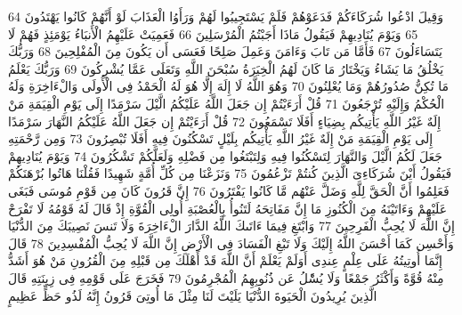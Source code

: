 \documentclass[20pt,a4paper]{article}
\begin{document}
{\tiny\colorbox{cl_aya}{64}} وَقِيلَ ادْعُوا شُرَكَاءَكُمْ فَدَعَوْهُمْ فَلَمْ يَسْتَجِيبُوا لَهُمْ وَرَأَوُا الْعَذَابَ لَوْ أَنَّهُمْ كَانُوا يَهْتَدُونَ
{\tiny\colorbox{cl_aya}{65}} وَيَوْمَ يُنَادِيهِمْ فَيَقُولُ مَاذَا أَجَبْتُمُ الْمُرْسَلِينَ
{\tiny\colorbox{cl_aya}{66}} فَعَمِيَتْ عَلَيْهِمُ الْأَنبَاءُ يَوْمَئِذٍ فَهُمْ لَا يَتَسَاءَلُونَ
{\tiny\colorbox{cl_aya}{67}} فَأَمَّا مَن تَابَ وَءَامَنَ وَعَمِلَ صَلِحًا فَعَسَى أَن يَكُونَ مِنَ الْمُفْلِحِينَ
{\tiny\colorbox{cl_aya}{68}} وَرَبُّكَ يَخْلُقُ مَا يَشَاءُ وَيَخْتَارُ مَا كَانَ لَهُمُ الْخِيَرَةُ سُبْحَنَ اللَّهِ وَتَعَلَى عَمَّا يُشْرِكُونَ
{\tiny\colorbox{cl_aya}{69}} وَرَبُّكَ يَعْلَمُ مَا تُكِنُّ صُدُورُهُمْ وَمَا يُعْلِنُونَ
{\tiny\colorbox{cl_aya}{70}} وَهُوَ اللَّهُ لَا إِلَهَ إِلَّا هُوَ لَهُ الْحَمْدُ فِى الْأُولَى وَالْءَاخِرَةِ وَلَهُ الْحُكْمُ وَإِلَيْهِ تُرْجَعُونَ
{\tiny\colorbox{cl_aya}{71}} قُلْ أَرَءَيْتُمْ إِن جَعَلَ اللَّهُ عَلَيْكُمُ الَّيْلَ سَرْمَدًا إِلَى يَوْمِ الْقِيَمَةِ مَنْ إِلَهٌ غَيْرُ اللَّهِ يَأْتِيكُم بِضِيَاءٍ أَفَلَا تَسْمَعُونَ
{\tiny\colorbox{cl_aya}{72}} قُلْ أَرَءَيْتُمْ إِن جَعَلَ اللَّهُ عَلَيْكُمُ النَّهَارَ سَرْمَدًا إِلَى يَوْمِ الْقِيَمَةِ مَنْ إِلَهٌ غَيْرُ اللَّهِ يَأْتِيكُم بِلَيْلٍ تَسْكُنُونَ فِيهِ أَفَلَا تُبْصِرُونَ
{\tiny\colorbox{cl_aya}{73}} وَمِن رَّحْمَتِهِ جَعَلَ لَكُمُ الَّيْلَ وَالنَّهَارَ لِتَسْكُنُوا فِيهِ وَلِتَبْتَغُوا مِن فَضْلِهِ وَلَعَلَّكُمْ تَشْكُرُونَ
{\tiny\colorbox{cl_aya}{74}} وَيَوْمَ يُنَادِيهِمْ فَيَقُولُ أَيْنَ شُرَكَاءِىَ الَّذِينَ كُنتُمْ تَزْعُمُونَ
{\tiny\colorbox{cl_aya}{75}} وَنَزَعْنَا مِن كُلِّ أُمَّةٍ شَهِيدًا فَقُلْنَا هَاتُوا بُرْهَنَكُمْ فَعَلِمُوا أَنَّ الْحَقَّ لِلَّهِ وَضَلَّ عَنْهُم مَّا كَانُوا يَفْتَرُونَ
{\tiny\colorbox{cl_aya}{76}} إِنَّ قَرُونَ كَانَ مِن قَوْمِ مُوسَى فَبَغَى عَلَيْهِمْ وَءَاتَيْنَهُ مِنَ الْكُنُوزِ مَا إِنَّ مَفَاتِحَهُ لَتَنُوأُ بِالْعُصْبَةِ أُولِى الْقُوَّةِ إِذْ قَالَ لَهُ قَوْمُهُ لَا تَفْرَحْ إِنَّ اللَّهَ لَا يُحِبُّ الْفَرِحِينَ
{\tiny\colorbox{cl_aya}{77}} وَابْتَغِ فِيمَا ءَاتَىكَ اللَّهُ الدَّارَ الْءَاخِرَةَ وَلَا تَنسَ نَصِيبَكَ مِنَ الدُّنْيَا وَأَحْسِن كَمَا أَحْسَنَ اللَّهُ إِلَيْكَ وَلَا تَبْغِ الْفَسَادَ فِى الْأَرْضِ إِنَّ اللَّهَ لَا يُحِبُّ الْمُفْسِدِينَ
{\tiny\colorbox{cl_aya}{78}} قَالَ إِنَّمَا أُوتِيتُهُ عَلَى عِلْمٍ عِندِى أَوَلَمْ يَعْلَمْ أَنَّ اللَّهَ قَدْ أَهْلَكَ مِن قَبْلِهِ مِنَ الْقُرُونِ مَنْ هُوَ أَشَدُّ مِنْهُ قُوَّةً وَأَكْثَرُ جَمْعًا وَلَا يُسَْٔلُ عَن ذُنُوبِهِمُ الْمُجْرِمُونَ
{\tiny\colorbox{cl_aya}{79}} فَخَرَجَ عَلَى قَوْمِهِ فِى زِينَتِهِ قَالَ الَّذِينَ يُرِيدُونَ الْحَيَوةَ الدُّنْيَا يَلَيْتَ لَنَا مِثْلَ مَا أُوتِىَ قَرُونُ إِنَّهُ لَذُو حَظٍّ عَظِيمٍ
\end{document}
